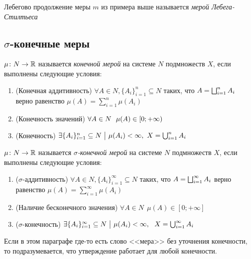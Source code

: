 \begin{definition}
	Лебегово продолжение меры $m$ из примера выше называется \textit{мерой Лебега-Стилтьеса}
\end{definition}

\subsection{$\sigma$-конечные меры}

\begin{definition}
	$\mu \colon N \to \mathbb{R}$ называется \textit{конечной мерой} на системе $N$ подмножеств $X$, если выполнены следующие условия:
	\begin{enumerate}
		\item (Конечная аддитивность) $\forall A \in N, \{A_i\}_{i = 1}^n \subseteq N$ таких, что $A = \bigsqcup_{i = 1}^n A_i$ верно равенство $\mu(A) = \sum_{i = 1}^n \mu(A_i)$
		
		\item (Конечность значений) $\forall A \in N\ \ \mu(A) \in \lsi{0; +\infty}$
		
		\item (Конечность) $\exists \{A_i\}_{i = 1}^n \subseteq N \ \big|\  \mu(A_i) < \infty,\ X = \bigcup_{i = 1}^n A_i$
	\end{enumerate}
\end{definition}

\begin{definition}
	$\mu \colon N \to \mathbb{R}$ называется \textit{$\sigma$-конечной мерой} на системе $N$ подмножеств $X$, если выполнены следующие условия:
	\begin{enumerate}
		\item ($\sigma$-аддитивность) $\forall A \in N, \{A_i\}_{i = 1}^\infty \subseteq N$ таких, что $A = \bigsqcup_{i = 1}^\infty A_i$ верно равенство $\mu(A) = \sum_{i = 1}^\infty \mu(A_i)$
		
		\item (Наличие бесконечного значения) $\forall A \in N\ \ \mu(A) \in [0; +\infty]$
		
		\item ($\sigma$-конечность) $\exists \{A_i\}_{i = 1}^\infty \subseteq N \ \big|\  \mu(A_i) < \infty,\ \ X = \bigcup_{i = 1}^\infty A_i$
	\end{enumerate}
\end{definition}

\begin{note}
	Если в этом параграфе где-то есть слово <<мера>> без уточнения конечности, то подразумевается, что утверждение работает для любой конечности.
\end{note}

